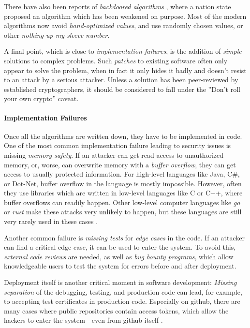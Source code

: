 There have also been reports of \emph{backdoored algorithms} \cite{DualEC},
where a nation state proposed an algorithm which has been weakened on purpose.
Most of the modern algorithms now avoid \emph{hand-optimized values}, and use
randomly chosen values, or other \emph{nothing-up-my-sleeve number}\cite{Salsa20}.

A final point, which is close to \emph{implementation failures}, is the addition
of \emph{simple} solutions to complex problems.
Such \emph{patches} to existing software often only appear to solve the problem,
when in fact it only hides it badly and doesn't resist to an attack by a serious
attacker.
Unless a solution has been peer-reviewed by established cryptographers, it should
be considered to fall under the ''Don't roll your own crypto'' \cite{SchneierLaw11} caveat.

\paragraph{Implementation Failures}

Once all the algorithms are written down, they have to be implemented in code.
One of the most common implementation failure leading to security issues is missing
\emph{memory safety}.
If an attacker can get read access to unauthorized memory, or, worse, can overwrite
memory with a \emph{buffer overflow}, they can get access to usually protected
information.
For high-level languages like Java, C\#, or Dot-Net, buffer overflow in the language
is mostly impossible.
However, often they use libraries which are written in low-level languages like
C or C++, where buffer overflows can readily happen.
Other low-level computer languages like \emph{go} or \emph{rust} make these attacks very unlikely
to happen, but these languages are still very rarely used in these cases \cite{HeartbleedXKCD}.

Another common failure is \emph{missing tests} for \emph{edge cases} in the code.
If an attacker can find a critical edge case, it can be used to enter the system.
To avoid this, \emph{external code reviews} are needed, as well as \emph{bug bounty programs},
which allow knowledgeable users to test the system for errors before and after
deployment.

Deployment itself is another critical moment in software development:
\emph{Missing separation} of the debugging, testing, and production code can lead, for
example, to accepting test certificates in production code.
Especially on github, there are many cases where public repositories contain
access tokens, which allow the hackers to enter the system - even from
github itself \cite{GithubPrivate23}.

